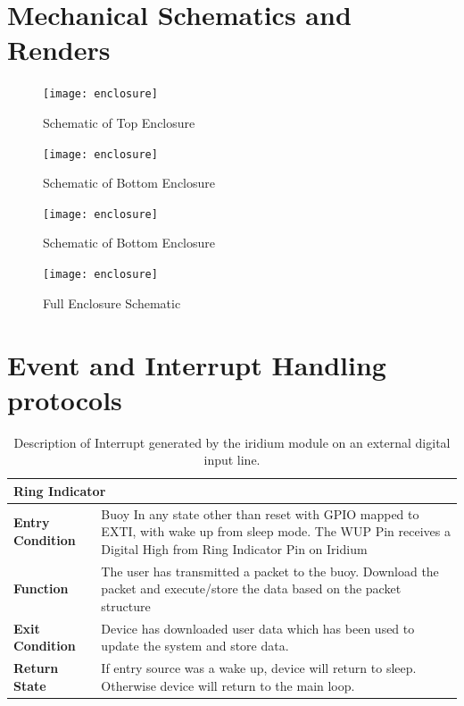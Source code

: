 \appendix

\chapter{Mechanical Schematics and Renders}
\label{ch:appendix.schem}

\begin{figure}[H]
    \centering
\texttt{[image: enclosure]}
    \caption{Schematic of Top Enclosure}
    \label{fig:top_schem}
\end{figure}

\begin{figure}[H]
    \centering
\texttt{[image: enclosure]}
    \caption{Schematic of Bottom Enclosure}
    \label{fig:bot_schem}
\end{figure}

\begin{figure}[H]
    \centering
\texttt{[image: enclosure]}
    \caption{Schematic of Bottom Enclosure}
    \label{fig:conblock_schem}
\end{figure}

\begin{figure}[H]
    \centering
\texttt{[image: enclosure]}
    \caption{Full Enclosure Schematic}
    \label{fig:full_schem}
\end{figure}

\chapter{Event and Interrupt Handling protocols} 
\label{sec:evt}

\begin{table}[H]
    \centering
    \caption{Description of Interrupt generated by the iridium module on an external digital input line.}
    \begin{tabular}{|m{}|m{}|}
    \hline
        \multicolumn{2}{|l|}{\textbf{Ring Indicator}} \\
        \hline
       \textbf{Entry Condition}  &  Buoy In any state other than reset with GPIO mapped to EXTI, with wake up from sleep mode. The WUP Pin receives a Digital High from Ring Indicator Pin on Iridium\\
       \hline
      \textbf{Function} &  The user has transmitted a packet to the buoy. Download the packet and execute/store the data based on the packet structure\\
       \hline
       \textbf{Exit Condition} & Device has downloaded user data which has been used to update the system and store data.\\
       \hline
       \textbf{Return State}& If entry source was a wake up, device will return to sleep. Otherwise device will return to the main loop.\\
       \hline
    \end{tabular}

    \label{tab:Int_desc_RI}
\end{table}

